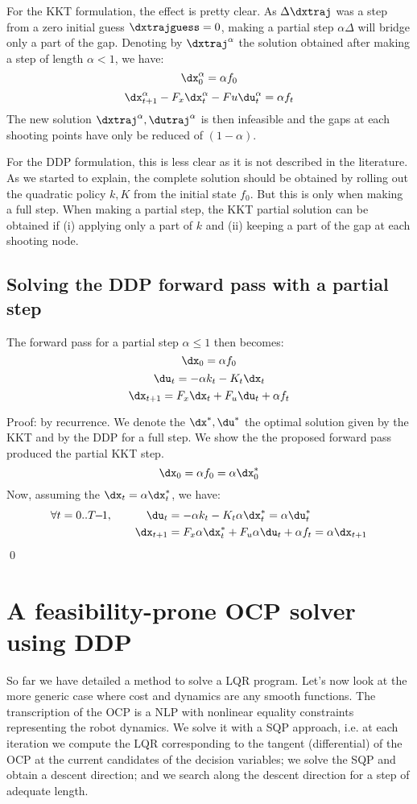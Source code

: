\documentclass[10pt,a4paper]{article}
\begin{document}
For the KKT formulation, the effect is pretty clear. As $\Delta \dxtraj$ was a step from a zero initial guess $\dxtrajguess = 0$, making a partial step $\alpha \Delta$ will bridge only a part of the gap. Denoting by $\dxtraj^\alpha$ the solution obtained after making a step of length $\alpha<1$, we have:
$$\dx_0^\alpha = \alpha f_0$$
$$\dx_{t+1}^\alpha - F_x \dx_t^\alpha - Fu \du_t^\alpha = \alpha f_t$$ 
The new solution  $\dxtraj^\alpha,\dutraj^\alpha$ is then infeasible and the gaps at each shooting points have only be reduced of $(1-\alpha)$.

For the DDP formulation, this is less clear as it is not described in the literature.
As we started to explain, the complete solution should be obtained by rolling out the quadratic policy $k,K$ from the initial state $f_0$.
But this is only when making a full step.
When making a partial step, the KKT partial solution can be obtained if (i) applying only a part of $k$ and (ii) keeping a part of the gap at each shooting node.

\subsection{Solving the DDP forward pass with a partial step}

The forward pass for a partial step $\alpha \le 1$ then becomes:
$$\dx_0 = \alpha f_0$$
$$\du_t = -\alpha k_t - K_t \dx_t$$
$$\dx_{t+1} = F_x \dx_t + F_u \du_t + \alpha f_t$$

Proof: by recurrence. We denote the $\dx^*,\du^*$ the optimal solution given by the KKT and by the DDP for a full step. We show the the proposed forward pass produced the partial KKT step.
$$\dx_0 = \alpha f_0 = \alpha \dx_0^*$$
Now, assuming the $\dx_t = \alpha \dx_t^*$, we have:
\begin{align*}
  \forall t=0..T\!\!-\!\!1,\quad\quad\quad \du_t &= -\alpha k_t - K_t \alpha \dx_t^* = \alpha \du_t^*\\
 \dx_{t+1} &= F_x \alpha  \dx_t^* + F_u \alpha \du_t + \alpha f_t = \alpha \dx_{t+1}
\end{align*}
\qed


\section{A feasibility-prone OCP solver using DDP}

So far we have detailed a method to solve a LQR program. Let's now look at the more generic case where cost and dynamics are any smooth functions.
The transcription of the OCP is a NLP with nonlinear equality constraints representing the robot dynamics.
We solve it with a SQP approach, i.e. at each iteration we compute the LQR corresponding to the tangent (differential) of the OCP at the current candidates of the decision variables; we solve the SQP and obtain a descent direction; and we search along the descent direction for a step of adequate length.
\end{document}
